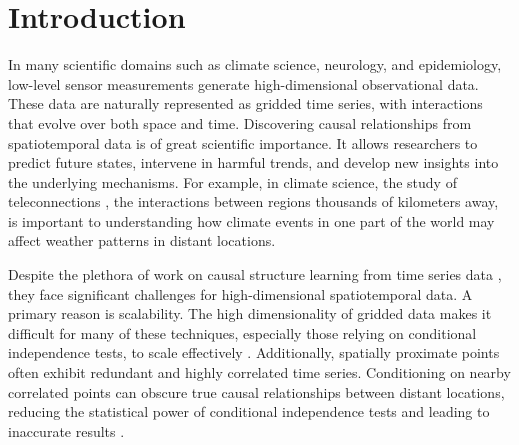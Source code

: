 
\section{Introduction}



In many scientific domains such as climate science, neurology, and epidemiology, low-level sensor measurements generate high-dimensional observational data. These data are naturally represented as gridded time series, with interactions that evolve over both space and time. Discovering causal relationships from spatiotemporal  data is of great  scientific importance.  It allows researchers to predict future states, intervene in harmful trends, and develop new insights into the underlying mechanisms. For example, in climate science, the study of teleconnections \citep{liu2023teleconnections}, the interactions between regions thousands of kilometers away, is important to understanding how climate events in one part of the world may affect weather patterns in distant locations. 



Despite the plethora of work on causal structure learning from time series data \citep{granger1969investigating, hyvarinen2010estimation, runge2020discovering, tank2021neural, gong2022rhino, cheng2023cutsneuralcausaldiscovery}, they face significant challenges for  high-dimensional spatiotemporal data. A primary reason is scalability. The high dimensionality of gridded data makes it difficult for many of these techniques, especially those relying on conditional independence tests, to scale effectively \citep{glymour2019review}. Additionally, spatially proximate points often exhibit redundant and highly correlated time series. Conditioning on nearby correlated points can obscure true causal relationships between distant locations, reducing the statistical power of conditional independence tests and leading to inaccurate results \citep{xavi2022teleconnection}.

